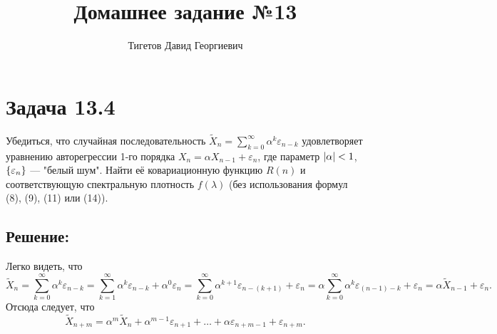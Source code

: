 \documentclass[12pt]{article}
\begin{document}
    \title{Домашнее задание №13}
    \author{Тигетов Давид Георгиевич}
    \date{}
    \maketitle

    \section*{Задача 13.4}
    Убедиться, что случайная последовательность $\widetilde{X}_n = \sum_{k=0}^\infty \alpha^k \varepsilon_{n-k}$ удовлетворяет уравнению авторегрессии 1-го порядка
    $X_n = \alpha X_{n-1} + \varepsilon_n$, где параметр $\left | \alpha \right | < 1$, $\left \{ \varepsilon_n \right \}$ --- "белый шум"{}. Найти её ковариационную функцию $R(n)$ и соответствующую
    спектральную плотность $f(\lambda)$ (без использования формул (8), (9), (11) или (14)).

    \subsection*{Решение:}
    Легко видеть, что
    \[
        \widetilde{X}_n
        = \sum_{k=0}^\infty \alpha^k \varepsilon_{n-k}
        = \sum_{k=1}^\infty \alpha^k \varepsilon_{n-k} + \alpha^0 \varepsilon_n
        = \sum_{k=0}^\infty \alpha^{k+1} \varepsilon_{n-(k+1)} + \varepsilon_n
        = \alpha \sum_{k=0}^\infty \alpha^k \varepsilon_{(n-1)-k} + \varepsilon_n
        = \alpha \widetilde{X}_{n-1} + \varepsilon_n .
    \]
    Отсюда следует, что
    \[
        \widetilde{X}_{n+m}
        = \alpha^m \widetilde{X}_n + \alpha^{m-1} \varepsilon_{n+1} + \dots + \alpha \varepsilon_{n+m-1} + \varepsilon_{n+m} .
    \]
\end{document}
